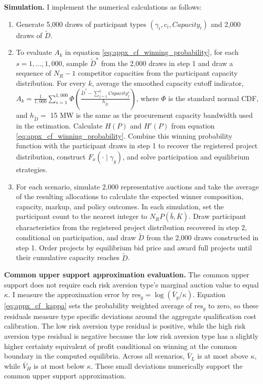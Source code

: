 \documentclass[12pt]{article}
\theoremstyle{definition} %
\begin{document}
\textbf{Simulation.} I implement the numerical calculations as follows:
\begin{enumerate}

\item Generate 5,000 draws of participant types $(\gamma_i,c_i,Capacity_i)$ and 2,000 draws of $\widetilde D$.

\item To evaluate $A_k$ in equation \eqref{eq:appx_cf_winning_probability}, for each $s=1,\ldots,1{,}000$, sample $\widetilde D^s$ from the 2,000 draws in step 1 and draw a sequence of $N_R-1$ competitor capacities from the participant capacity distribution. For every $k$, average the smoothed capacity cutoff indicator, $A_k=\frac{1}{1{,}000}\sum_{s=1}^{1{,}000} \Phi\left(\frac{\widetilde D^s-\sum_{j=1}^k Capacity_j^s}{h_{\widetilde D}}\right)$, where $\Phi$ is the standard normal CDF, and $h_{\widetilde D} =$ 15 MW is the same as the procurement capacity bandwidth used in the estimation. Calculate $H(P)$ and $H'(P)$ from equation \eqref{eq:appx_cf_winning_probability}. Combine this winning probability function with the participant draws in step 1 to recover the registered project distribution, construct $F_x(\cdot\mid\gamma_g)$, and solve participation and equilibrium strategies.

\item For each scenario, simulate 2,000 representative auctions and take the average of the resulting allocations to calculate the expected winner composition, capacity, markup, and policy outcomes. In each simulation, set the participant count to the nearest integer to $N_RP(\bar b,\bar K)$. Draw participant characteristics from the registered project distribution recovered in step 2, conditional on participation, and draw $\widetilde D$ from the 2,000 draws constructed in step 1. Order projects by equilibrium bid price and award full projects until their cumulative capacity reaches $\widetilde D$.

\end{enumerate}

\textbf{Common upper support approximation evaluation.} The common upper support does not require each risk aversion type's marginal auction value to equal $\kappa$. I measure the approximation error by $\mathrm{res}_g=\log(\bar V_g/\kappa)$. Equation \eqref{eq:appx_cf_kappa} sets the probability weighted average of $\mathrm{res}_g$ to zero, so these residuals measure type specific deviations around the aggregate qualification cost calibration. The low risk aversion type residual is positive, while the high risk aversion type residual is negative because the low risk aversion type has a slightly higher certainty equivalent of profit conditional on winning at the common boundary in the computed equilibria. Across all scenarios, $\bar V_L$ is at most  above $\kappa$, while $\bar V_H$ is at most  below $\kappa$. These small deviations numerically support the common upper support approximation.

\singlespacing


\end{document}
